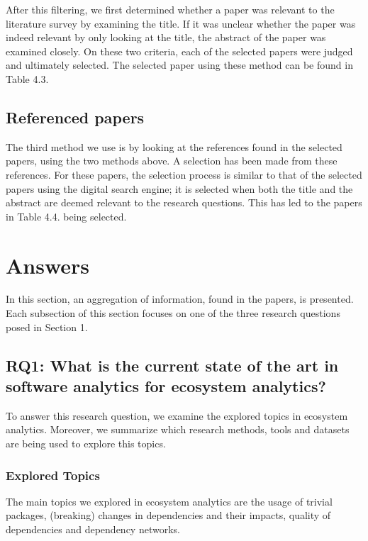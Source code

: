 \documentclass[]{book}
\begin{document}
After this filtering, we first determined whether a paper was relevant
to the literature survey by examining the title. If it was unclear
whether the paper was indeed relevant by only looking at the title, the
abstract of the paper was examined closely. On these two criteria, each
of the selected papers were judged and ultimately selected. The selected
paper using these method can be found in Table 4.3.

\subsection{Referenced papers}\label{referenced-papers}

The third method we use is by looking at the references found in the
selected papers, using the two methods above. A selection has been made
from these references. For these papers, the selection process is
similar to that of the selected papers using the digital search engine;
it is selected when both the title and the abstract are deemed relevant
to the research questions. This has led to the papers in Table 4.4.
being selected.

\section{Answers}\label{answers-2}

In this section, an aggregation of information, found in the papers, is
presented. Each subsection of this section focuses on one of the three
research questions posed in Section 1.

\subsection{RQ1: What is the current state of the art in software
analytics for ecosystem
analytics?}\label{rq1-what-is-the-current-state-of-the-art-in-software-analytics-for-ecosystem-analytics}

To answer this research question, we examine the explored topics in
ecosystem analytics. Moreover, we summarize which research methods,
tools and datasets are being used to explore this topics.

\subsubsection{Explored Topics}\label{explored-topics}

The main topics we explored in ecosystem analytics are the usage of
trivial packages, (breaking) changes in dependencies and their impacts,
quality of dependencies and dependency networks.
\end{document}

